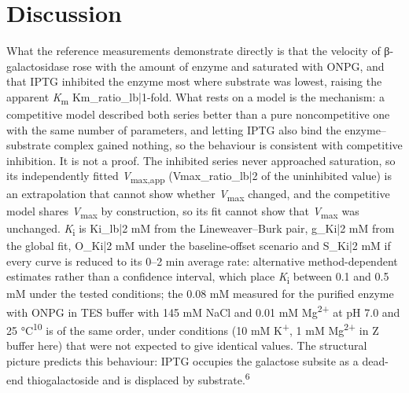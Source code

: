 \documentclass[9pt,twocolumn]{extarticle}
\newcommand{\cit}[1]{\textsuperscript{#1}}
\newcommand{\Km}{\textit{K}\textsubscript{m}}
\newcommand{\Vmax}{\textit{V}\textsubscript{max}}
\newcommand{\Vmaxapp}{\textit{V}\textsubscript{max,app}}
\newcommand{\Ki}{\textit{K}\textsubscript{i}}
\newcommand{\dash}{–}
\begin{document}
\section{Discussion}
What the reference measurements demonstrate directly is that the velocity of β-galactosidase rose with the amount of enzyme and saturated with ONPG, and that IPTG inhibited the enzyme most where substrate was lowest, raising the apparent \Km{} {{Km_ratio_lb|1}}-fold. What rests on a model is the mechanism: a competitive model described both series better than a pure noncompetitive one with the same number of parameters, and letting IPTG also bind the enzyme\dash substrate complex gained nothing, so the behaviour is consistent with competitive inhibition. It is not a proof. The inhibited series never approached saturation, so its independently fitted \Vmaxapp{} ({{Vmax_ratio_lb|2}} of the uninhibited value) is an extrapolation that cannot show whether \Vmax{} changed, and the competitive model shares \Vmax{} by construction, so its fit cannot show that \Vmax{} was unchanged. \Ki{} is {{Ki_lb|2}} mM from the Lineweaver\dash Burk pair, {{g_Ki|2}} mM from the global fit, {{O_Ki|2}} mM under the baseline-offset scenario and {{S_Ki|2}} mM if every curve is reduced to its 0\dash 2 min average rate: alternative method-dependent estimates rather than a confidence interval, which place \Ki{} between 0.1 and 0.5 mM under the tested conditions; the 0.08 mM measured for the purified enzyme with ONPG in TES buffer with 145 mM NaCl and 0.01 mM Mg\textsuperscript{2+} at pH 7.0 and 25 °C\cit{10} is of the same order, under conditions (10 mM K\textsuperscript{+}, 1 mM Mg\textsuperscript{2+} in Z buffer here) that were not expected to give identical values. The structural picture predicts this behaviour: IPTG occupies the galactose subsite as a dead-end thiogalactoside and is displaced by substrate.\cit{6}
\end{document}
